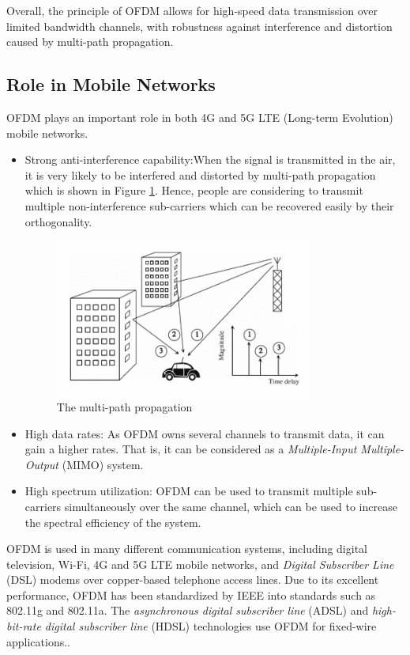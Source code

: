 \documentclass[11pt]{article}
\numberwithin{figure}{section}
\numberwithin{equation}{section}
\begin{document}
Overall, the principle of OFDM allows for high-speed data transmission over limited bandwidth channels, with robustness against interference and distortion caused by multi-path propagation. 

\subsection{Role in Mobile Networks}
OFDM plays an important role in both 4G and 5G LTE (Long-term Evolution) mobile networks.
\begin{itemize}
    \item Strong anti-interference capability:When the signal is transmitted in the air, it is very likely to be interfered and distorted by multi-path propagation which is shown in Figure \ref{fig:multipath propagation}. Hence, people are considering to transmit multiple non-interference sub-carriers which can be recovered easily by their orthogonality.
    \begin{figure}[!ht]
        \centering
        \includegraphics[width=0.8\textwidth]{images/multipath propagation.png}
        \caption{\label{fig:multipath propagation}The multi-path propagation}
    \end{figure}
    \item High data rates: As OFDM owns several channels to transmit data, it can gain a higher rates. That is, it can be considered as a \textit{Multiple-Input Multiple-Output} (MIMO) system.
    \item High spectrum utilization: OFDM can be used to transmit multiple sub-carriers simultaneously over the same channel, which can be used to increase the spectral efficiency of the system.
\end{itemize}

OFDM is used in many different communication systems, including digital television, Wi-Fi, 4G and 5G LTE  mobile networks, and \textit{Digital Subscriber Line} (DSL) modems over copper-based telephone access lines. Due to its excellent performance, OFDM has been standardized by IEEE into standards such as 802.11g and 802.11a. The \textit{asynchronous digital subscriber line} (ADSL) and \textit{high-bit-rate digital subscriber line} (HDSL) technologies use OFDM for fixed-wire applications.\cite{RN78, RN79}.
\end{document}
